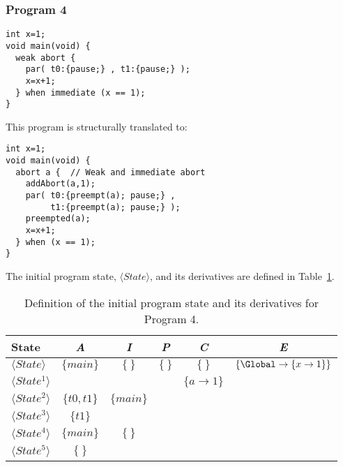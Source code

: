 \subsubsection{Program 4}
\begin{lstlisting}[style=snippet]
int x=1;
void main(void) {
  weak abort {
    par( t0:{pause;} , t1:{pause;} );
    x=x+1;
  } when immediate (x == 1);
}
\end{lstlisting}
This program is structurally translated to:
\begin{lstlisting}[style=snippet]
int x=1;
void main(void) {
  abort a {  // Weak and immediate abort
    addAbort(a,1);
    par( t0:{preempt(a); pause;} ,
         t1:{preempt(a); pause;} );
    preempted(a);
    x=x+1;
  } when (x == 1);
}
\end{lstlisting}
The initial program state, $\langle State \rangle$,
and its derivatives are defined in Table~\ref{table:forec_program_4}.
\newline

\begin{table}[t]
	\centering
	\renewcommand{\arraystretch}{1.25}
	
	\begin{tabular}{| l | c | c | c | c | c |}
		\hline
		\textbf{State}						& \textbf{\textit{A}}			& \textbf{\textit{I}} 		& \textbf{\textit{P}} 	& \textbf{\textit{C}} 		& \textbf{\textit{E}}										\\ \hline
		$\langle State \rangle$				& $\lbrace main \rbrace$		& $\lbrace ~ \rbrace$		& $\lbrace ~ \rbrace$	& $\lbrace ~ \rbrace$		& $\lbrace \Global \to \lbrace x \to 1 \rbrace \rbrace$		\\ \cline{1-1} \cline{5-5}
		$\langle State^1 \rangle$			&								&							&						& $\lbrace a \to 1 \rbrace$	& 															\\ \cline{1-3}
		$\langle State^2 \rangle$			& $\lbrace t0, t1 \rbrace$		& $\lbrace main \rbrace$	&						&							& 															\\ \cline{1-2}
		$\langle State^3 \rangle$			& $\lbrace t1 \rbrace$			& 							&						&							& 															\\ \cline{1-3}
		$\langle State^4 \rangle$			& $\lbrace main \rbrace$		& $\lbrace ~ \rbrace$		&						&							& 															\\ \cline{1-2}
		$\langle State^5 \rangle$			& $\lbrace ~ \rbrace$			& 							& 						&							& 															\\ \hline
	\end{tabular}
	
	\caption{Definition of the initial program state and its derivatives for Program 4.}
	\label{table:forec_program_4}
\end{table}

